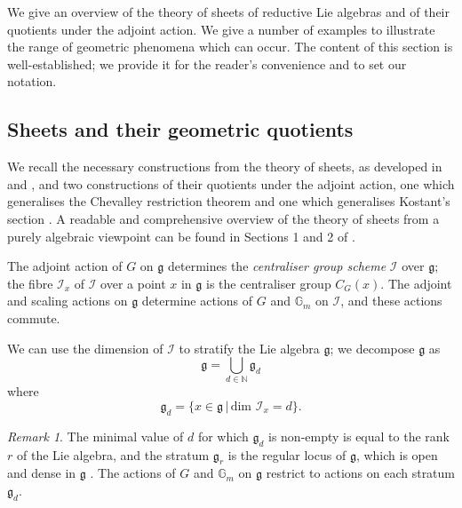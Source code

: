 \documentclass{amsart}
\theoremstyle{remark}
\newtheorem{remark}[theorem]{Remark}
\numberwithin{theorem}{section}
\numberwithin{equation}{section}
\begin{document}
We give an overview of the theory of sheets of reductive Lie algebras and of their quotients under the adjoint action. We give a number of examples to illustrate the range of geometric phenomena which can occur. The content of this section is well-established; we provide it for the reader's convenience and to set our notation.

\subsection{Sheets and their geometric quotients}\label{SheetsQuotientssbn}
We recall the necessary constructions from the theory of sheets, as developed in \cite{BK} and \cite{Borho2}, and two constructions of their quotients under the adjoint action, one which generalises the Chevalley restriction theorem \cite{Borho2} and one which generalises Kostant's section \cite{Katsylo}. A readable and comprehensive overview of the theory of sheets from a purely algebraic viewpoint can be found in Sections 1 and 2 of \cite{ImHof}.

The adjoint action of $G$ on $\mathfrak{g}$ determines the \emph{centraliser group scheme} $\mathcal I$ over $\mathfrak{g}$; the fibre $\mathcal I_x$ of $\mathcal I$ over a point $x$ in $\mathfrak{g}$ is the centraliser group $C_G(x)$. The adjoint and scaling actions on $\mathfrak{g}$ determine actions of $G$ and $\mathbb{G}_m$ on $\mathcal I$, and these actions commute.

We can use the dimension of $\mathcal I$ to stratify the Lie algebra $\mathfrak{g}$; we decompose $\mathfrak{g}$ as   
\begin{equation}\label{Centraliserstrateqn}
    \mathfrak{g} = \bigcup_{d \in \mathbb{N}} \mathfrak{g}_d
\end{equation}
where
\begin{equation}\label{Centraliserdimeqn}
    \mathfrak{g}_d = \{ x \in \mathfrak{g} \, | \, \text{dim } \mathcal I_x = d \}.
\end{equation}

\begin{remark}\label{Centraliserstratrmk}
    The minimal value of $d$ for which $\mathfrak{g}_d$ is non-empty is equal to the rank $r$ of the Lie algebra, and the stratum $\mathfrak{g}_r$ is the regular locus of $\mathfrak{g}$, which is open and dense in $\mathfrak{g}$ \cite{Kostant}. The actions of $G$ and $\mathbb{G}_m$ on $\mathfrak{g}$ restrict to actions on each stratum $\mathfrak{g}_d$.
\end{remark}
\end{document}
